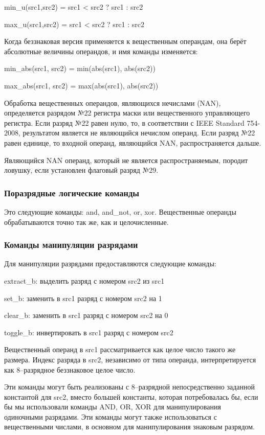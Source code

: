 \documentclass[forwardcom.tex]{subfiles}
\begin{document}
min\_u(src1,src2) = src1 \textless{} src2 ? src1 : src2

max\_u(src1,src2) = src1 \textless{} src2 ? src1 : src2

Когда беззнаковая версия применяется к вещественным операндам, она берёт абсолютные величины операндов, и имя команды изменяется:

min\_abs(src1, src2) = min(abs(src1), abs(src2))

max\_abs(src1, src2) = max(abs(src1), abs(src2))

Обработка вещественных операндов, являющихся нечислами (NAN), определяется разрядом №22 регистра маски или вещественного управляющего регистра. Если разряд №22 равен нулю, то, в соответствии с  IEEE Standard 754-2008, результатом является не являющийся нечислом операнд. Если разряд №22 равен единице, то входной операнд, являющийся NAN, распространяется дальше.

Являющийся NAN операнд, который не является распространяемым, породит ловушку, если установлен флаговый разряд №29.

\subsubsection{Поразрядные логические команды}
Это следующие команды: and, and\_not, or, xor. Вещественные операнды обрабатываются точно так же, как и целочисленные.

\subsubsection{Команды манипуляции разрядами}
Для манипуляции разрядами предоставляются следующие команды: 

extract\_b: выделить разряд с номером src2 из src1

set\_b: заменить в src1 разряд с номером src2 на 1

clear\_b: заменить в src1 разряд с номером src2 на 0

toggle\_b: инвертировать в src1 разряд с номером src2

Вещественный операнд в src1 рассматривается как целое число такого же размера. Индекс разряда в src2, независимо от типа операнда, интерпретируется как 8--разрядное беззнаковое целое число.

Эти команды могут быть реализованы с 8--разрядной непосредственно заданной константой для src2, вместо большей константы, которая потребовалась бы, если бы мы использовали команды AND, OR, XOR для манипулирования одиночными разрядами. Эти команды могут также использоваться с вещественными числами, в основном для манипулирования знаковым разрядом.
\end{document}
